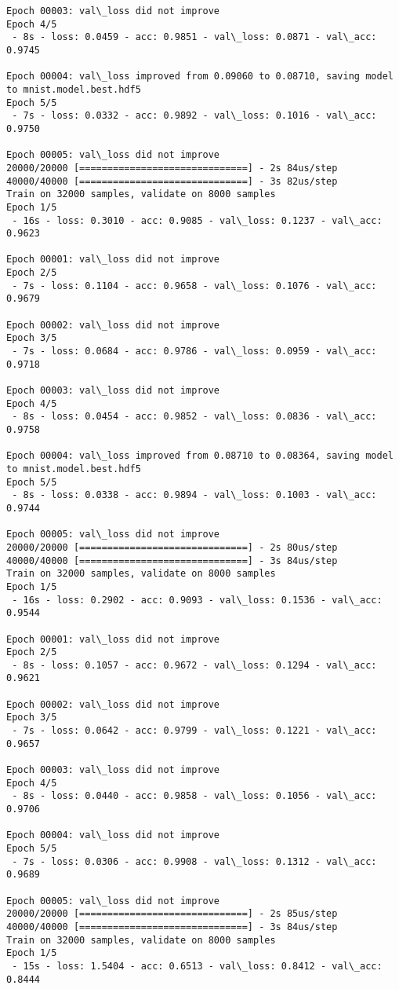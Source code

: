 \documentclass[11pt]{article}
\begin{document}
\begin{Verbatim}[commandchars=\\\{\}]
Epoch 00003: val\_loss did not improve
Epoch 4/5
 - 8s - loss: 0.0459 - acc: 0.9851 - val\_loss: 0.0871 - val\_acc: 0.9745

Epoch 00004: val\_loss improved from 0.09060 to 0.08710, saving model to mnist.model.best.hdf5
Epoch 5/5
 - 7s - loss: 0.0332 - acc: 0.9892 - val\_loss: 0.1016 - val\_acc: 0.9750

Epoch 00005: val\_loss did not improve
20000/20000 [==============================] - 2s 84us/step
40000/40000 [==============================] - 3s 82us/step
Train on 32000 samples, validate on 8000 samples
Epoch 1/5
 - 16s - loss: 0.3010 - acc: 0.9085 - val\_loss: 0.1237 - val\_acc: 0.9623

Epoch 00001: val\_loss did not improve
Epoch 2/5
 - 7s - loss: 0.1104 - acc: 0.9658 - val\_loss: 0.1076 - val\_acc: 0.9679

Epoch 00002: val\_loss did not improve
Epoch 3/5
 - 7s - loss: 0.0684 - acc: 0.9786 - val\_loss: 0.0959 - val\_acc: 0.9718

Epoch 00003: val\_loss did not improve
Epoch 4/5
 - 8s - loss: 0.0454 - acc: 0.9852 - val\_loss: 0.0836 - val\_acc: 0.9758

Epoch 00004: val\_loss improved from 0.08710 to 0.08364, saving model to mnist.model.best.hdf5
Epoch 5/5
 - 8s - loss: 0.0338 - acc: 0.9894 - val\_loss: 0.1003 - val\_acc: 0.9744

Epoch 00005: val\_loss did not improve
20000/20000 [==============================] - 2s 80us/step
40000/40000 [==============================] - 3s 84us/step
Train on 32000 samples, validate on 8000 samples
Epoch 1/5
 - 16s - loss: 0.2902 - acc: 0.9093 - val\_loss: 0.1536 - val\_acc: 0.9544

Epoch 00001: val\_loss did not improve
Epoch 2/5
 - 8s - loss: 0.1057 - acc: 0.9672 - val\_loss: 0.1294 - val\_acc: 0.9621

Epoch 00002: val\_loss did not improve
Epoch 3/5
 - 7s - loss: 0.0642 - acc: 0.9799 - val\_loss: 0.1221 - val\_acc: 0.9657

Epoch 00003: val\_loss did not improve
Epoch 4/5
 - 8s - loss: 0.0440 - acc: 0.9858 - val\_loss: 0.1056 - val\_acc: 0.9706

Epoch 00004: val\_loss did not improve
Epoch 5/5
 - 7s - loss: 0.0306 - acc: 0.9908 - val\_loss: 0.1312 - val\_acc: 0.9689

Epoch 00005: val\_loss did not improve
20000/20000 [==============================] - 2s 85us/step
40000/40000 [==============================] - 3s 84us/step
Train on 32000 samples, validate on 8000 samples
Epoch 1/5
 - 15s - loss: 1.5404 - acc: 0.6513 - val\_loss: 0.8412 - val\_acc: 0.8444


\end{Verbatim}
\end{document}
